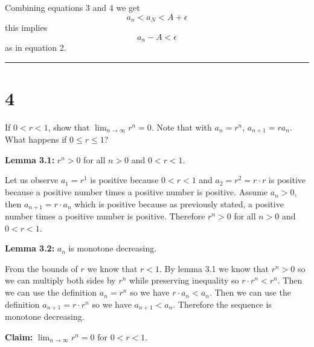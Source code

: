 \documentclass[10pt,letterpaper]{article}
\newcommand\ds{\displaystyle}
\newcommand\qedsym{\hfill \rule{2mm}{2mm}}
\begin{document}
Combining equations 3 and 4 we get \[a_n < a_N < A + \epsilon\] this implies \[a_n - A < \epsilon\] as in equation 2. \qedsym{}

\section*{4} If $0 < r < 1$, show that $\ds \lim_{n \to \infty} r^n= 0$. Note that with $a_n = r^n$, $a_{n+1} = r a_n$. What happens if $0 \leq r \leq 1$?

\medskip

\textbf{Lemma 3.1:} $r^n > 0$ for all $n > 0$ and $0 < r < 1$.

Let us observe $a_1 = r^1$ is positive because $0 < r < 1$ and $a_2 = r^2 = r\cdot r$ is positive because a positive number times a positive number is positive. Assume $a_n > 0$, then $a_{n+1} = r\cdot a_n$ which is positive because as previously stated, a positive number times a positive number is positive. Therefore $r^n > 0$ for all $n > 0$ and $0 < r < 1$.

\medskip

\textbf{Lemma 3.2:} $a_n$ is monotone decreasing.

From the bounds of $r$ we know that $r<1$. By lemma 3.1 we know that $r^n > 0$ so we can multiply both sides by $r^n$ while preserving inequality so $r\cdot r^n < r^n$. Then we can use the definition $a_n = r^n$ so we have $r\cdot a_n < a_n$. Then we can use the definition $a_{n+1} = r\cdot r^n$ so we have $a_{n+1} < a_n$. Therefore the sequence is monotone decreasing.

\medskip

\textbf{Claim:} $\ds \lim_{n \to \infty} r^n= 0$ for $0 < r < 1$.

\medskip
\end{document}
